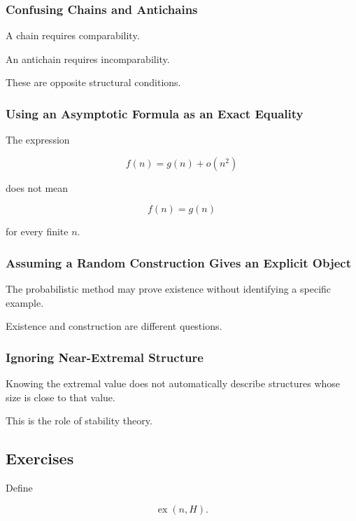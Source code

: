 \subsubsection{Confusing Chains and Antichains}

A chain requires comparability.

An antichain requires incomparability.

These are opposite structural conditions.

\subsubsection{Using an Asymptotic Formula as an Exact Equality}

The expression

\[
f(n)
=
g(n)+o(n^2)
\]

does not mean

\[
f(n)=g(n)
\]

for every finite \(n\).

\subsubsection{Assuming a Random Construction Gives an Explicit Object}

The probabilistic method may prove existence without identifying a
specific example.

Existence and construction are different questions.

\subsubsection{Ignoring Near-Extremal Structure}

Knowing the extremal value does not automatically describe structures
whose size is close to that value.

This is the role of stability theory.

\subsection{Exercises}
\label{subsec:extremal-combinatorics-exercises}

\begin{exercise}[1]
Define

\[
\operatorname{ex}(n,H).
\]
\end{exercise}

